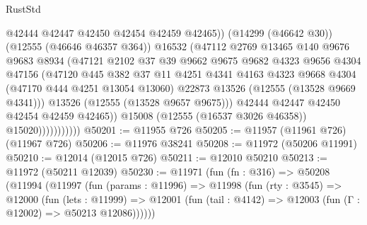 \begin{lexlean}{RustStd}
\begin{coremodule}
                                @42444
                                @42447
                                @42450
                                @42454
                                @42459
                                @42465))
                            (@14299 (@46642 @30))
                            (@12555 (@46646 @46357 @364))
                            @16532
                            (@47112
                              @2769
                              @13465
                              @140
                              @9676
                              @9683
                              @8934
                              (@47121
                                @2102
                                @37
                                @39
                                @9662
                                @9675
                                @9682
                                @4323
                                @9656
                                @4304
                                @47156
                                (@47120
                                  @445
                                  @382
                                  @37
                                  @11
                                  @4251
                                  @4341
                                  @4163
                                  @4323
                                  @9668
                                  @4304
                                  (@47170 @444 @4251 @13054 @13060)
                                  @22873
                                  @13526
                                  (@12555 (@13528 @9669 @4341)))
                                @13526
                                (@12555 (@13528 @9657 @9675)))
                              @42444
                              @42447
                              @42450
                              @42454
                              @42459
                              @42465))
                          @15008
                          (@12555 (@16537 @3026 @46358))
                          @15020)))))))))))
@50201 := @11955 @726
@50205 := @11957 (@11961 @726) (@11967 @726)
@50206 := @11976 @38241
@50208 := @11972 (@50206 @11991)
@50210 := @12014 (@12015 @726)
@50211 := @12010 @50210
@50213 := @11972 (@50211 @12039)
@50230 := @11971
    (fun (fn : @316) =>
    @50208
      (@11994
        (@11997
          (fun (params : @11996) =>
          @11998
            (fun (rty : @3545) =>
            @12000
              (fun (lets : @11999) =>
              @12001 (fun (tail : @4142) => @12003 (fun (Γ : @12002) => @50213 @12086))))))

\end{coremodule}
\end{lexlean}
